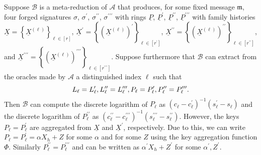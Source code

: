 \documentclass{iacrtrans}
\theoremstyle{definition}
\numberwithin{theorem}{subsection}
\numberwithin{lemma}{theorem}
\newcommand{\adversary}{\mathcal{A}}
\begin{document}
Suppose $\mathcal{B}$ is a meta-reduction of $\adversary$ that produces, for some fixed message $\mathfrak{m}$, four forged signatures $\sigma$, $\sigma^\prime$, $\sigma^{\prime \prime}$, $\sigma^{\prime \prime \prime}$ with rings $\underline{P}$, $\underline{P}^\prime$, $\underline{P}^{\prime \prime}$, $\underline{P}^{\prime \prime \prime}$ with family histories $\underline{X} = \left\{\underline{X}^{(\ell)}\right\}_{\ell \in [r]}$, $\underline{X}^\prime = \left\{(\underline{X}^{ (\ell)})^\prime\right\}_{\ell \in [r^\prime] }$, $\underline{X}^{\prime \prime} = \left\{(\underline{X}^{(\ell)})^{\prime \prime}\right\}_{\ell \in [r^{\prime \prime}]}$, and $\underline{X}^{\prime \prime \prime} = \left\{(\underline{X}^{ (\ell)})^{\prime \prime \prime}\right\}_{\ell \in [r^{\prime \prime\prime}]}$. Suppose furthermore that $\mathcal{B}$ can extract from the oracles made by $\adversary$ a distinguished index $\ell$ such that \[L_\ell = L_\ell^\prime, \vspace{0.05in} L_\ell^{\prime \prime} = L_\ell^{\prime \prime \prime}, \vspace{0.05in} 
P_\ell = P_\ell^\prime, \vspace{0.05in}  P_\ell^{\prime \prime} = P_\ell^{\prime \prime \prime}.\] Then $\mathcal{B}$ can compute the discrete logarithm of $P_\ell$ as $(c_\ell - c_\ell^\prime)^{-1}(s_\ell^\prime - s_\ell)$ and the discrete logarithm of $P_\ell^{\prime \prime}$ as $(c_\ell^{\prime \prime} - c_\ell^{\prime \prime \prime})^{-1}(s_\ell^{\prime \prime \prime} - s_\ell^{\prime \prime})$.  However, the keys $P_\ell = P_\ell^\prime$ are aggregated from $\underline{X}$ and $\underline{X}^{\prime}$, respectively. Due to this, we can write $P_\ell = P_\ell^\prime = \alpha X_h + Z$ for some $\alpha$ and for some $Z$ using the key aggregation function $\Phi$. Similarly $P_\ell^{\prime \prime} = P_\ell^{\prime \prime \prime}$ and can be written as $\alpha^\prime X_h + Z^\prime$ for some $\alpha^\prime, Z^\prime$. 
\end{document}
